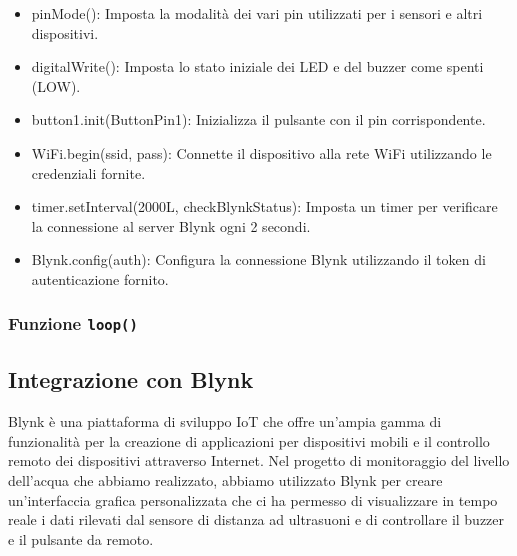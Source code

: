 \begin{itemize}
    \item pinMode(): Imposta la modalità dei vari pin utilizzati per i sensori e altri dispositivi.
    \item digitalWrite(): Imposta lo stato iniziale dei LED e del buzzer come spenti (LOW).
    \item button1.init(ButtonPin1): Inizializza il pulsante con il pin corrispondente.
    \item WiFi.begin(ssid, pass): Connette il dispositivo alla rete WiFi utilizzando le credenziali fornite.
    \item timer.setInterval(2000L, checkBlynkStatus): Imposta un timer per verificare la connessione al server Blynk ogni 2 secondi.
    \item Blynk.config(auth): Configura la connessione Blynk utilizzando il token di autenticazione fornito. 
\end{itemize}

\subsubsection{Funzione \texttt{loop()}}


\subsection{Integrazione con Blynk}

Blynk è una piattaforma di sviluppo IoT che offre un'ampia gamma di funzionalità per la creazione di applicazioni per dispositivi mobili e il controllo remoto dei dispositivi attraverso Internet. Nel progetto di monitoraggio del livello dell'acqua che abbiamo realizzato, abbiamo utilizzato Blynk per creare un'interfaccia grafica personalizzata che ci ha permesso di visualizzare in tempo reale i dati rilevati dal sensore di distanza ad ultrasuoni e di controllare il buzzer e il pulsante da remoto. \\

